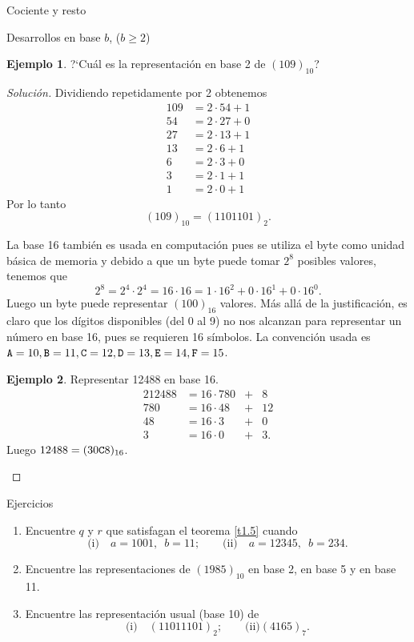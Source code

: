 \documentclass[11pt,spanish,makeidx]{amsbook}
\theoremstyle{definition}
\newtheorem{ejemplo}{Ejemplo}[section]
\theoremstyle{remark}
\begin{document}
\begin{section}{Cociente y resto}
\begin{subsection}{Desarrollos en base $b$, ($b \ge 2$)}
\begin{ejemplo} ?`Cuál es la representación en base 2 de $(109)_{10}$?
\end{ejemplo}
\begin{proof}[Solución] Dividiendo repetidamente por 2 obtenemos
$$
\begin{aligned}
109&=2\cdot 54+1\\ 54&=2\cdot 27+0\\ 27&=2\cdot 13+1\\ 13&=2\cdot 6+1\\
6&=2\cdot 3+0 \\ 3&=2\cdot 1+1 \\1&=2\cdot 0+1
\end{aligned}
$$
Por lo tanto
$$
(109)_{10} = (1101101)_2.
$$

La base 16 también es usada en computación pues se utiliza el byte como unidad básica de memoria y debido a que un byte puede tomar $2^8$ posibles valores, tenemos que $$2^8 = 2^4 \cdot 2^4 = 16 \cdot 16 = 1 \cdot 16^2 + 0 \cdot 16^1 + 0 \cdot 16^0.$$ Luego   un byte puede representar $(100)_{16}$ valores. Más allá de la justificación, es claro que los dígitos disponibles (del 0  al 9) no nos alcanzan  para representar un  número en base 16, pues se requieren 16 símbolos. La convención usada es ${\tt A}=10, {\tt B}=11, {\tt C} =12, {\tt D} = 13, {\tt E} = 14, {\tt F} = 15$.

\begin{ejemplo} Representar  12488 en  base 16.
\begin{alignat*}2
12488 &= 16 \cdot 780 &+&  8\\
780 & = 16 \cdot 48 &+& 12\\
48 & = 16\cdot 3 &+& 0\\
3 & = 16 \cdot 0  &+& 3.
\end{alignat*}
Luego $12488 = (30{\tt C}8)_{16}$.
\end{ejemplo}

\end{proof}

\end{subsection}
\begin{subsection}{Ejercicios}
\begin{enumerate}
\item Encuentre $q$ y $r$ que satisfagan el teorema \ref{t1.5} cuando
$$
\text{(i)}\quad a=1001,\,\,\, b=11; \qquad \text{(ii)}\quad
a=12345,\,\,\, b=234.
$$
\item Encuentre las representaciones de $(1985)_{10}$ en base 2, en base 5 y en base 11.
\item
 Encuentre las representación usual (base 10) de
$$
\text{(i)} \quad (11011101)_2; \qquad \text{(ii)} (4165)_7.
$$
\end{enumerate}
\end{subsection}
\end{section}
\end{document}
